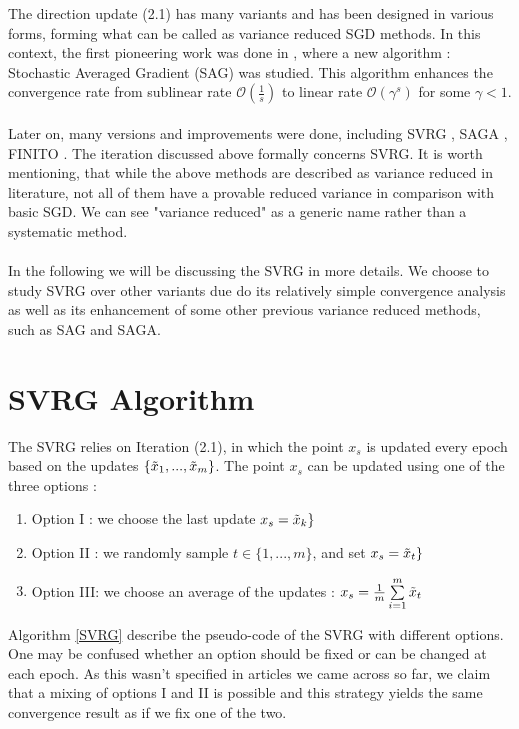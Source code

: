 \documentclass[12pt]{report}
\begin{document}
The direction update (2.1) has many variants and has been designed in various forms, forming what can be called as variance reduced SGD methods. In this context, the first pioneering work was done in \cite{schmidt2017minimizing}, where a new algorithm : Stochastic Averaged Gradient (SAG) was studied. This algorithm enhances the convergence rate from sublinear rate $\mathcal{O}(\frac{1}{s})$ to linear rate $\mathcal{O}(\gamma^s)$ for some $\gamma<1$. \\
\\Later on, many versions and improvements were done, including SVRG \cite{johnson2013accelerating}, SAGA \cite{defazio2014saga}, FINITO \cite{defazio2014finito}.
The iteration discussed above formally concerns SVRG.
It is worth mentioning, that while the above methods are described as variance reduced in literature, not all of them have a provable reduced variance in comparison with basic SGD. We can see "variance reduced" as a generic name rather than a systematic method. \\
\\In the following we will be discussing the SVRG in more details. We choose to study SVRG over other variants due do its relatively simple convergence analysis as well as its enhancement of some other previous variance reduced methods, such as SAG and SAGA.


\section{SVRG Algorithm}
The SVRG relies on Iteration (2.1), in which the point $x_s$ is updated every epoch based on the updates $\{\Tilde{x}_1,...,\Tilde{x}_m\}$. The point $x_s$ can be updated using one of the three options : 
\begin{enumerate}
    \item Option I : we choose the last update $x_s=\Tilde{x}_k\}$
    \item Option II : we randomly sample $t\in\{1,...,m\}$, and set $x_s=\Tilde{x}_t\}$
    \item Option III: we choose an average of the updates : $x_s=\frac{1}{m}\sum\limits_{i=1}^m \Tilde{x}_t$ 
\end{enumerate}
Algorithm \ref{SVRG} describe the pseudo-code of the SVRG with different options. One may be confused whether an option should be fixed or can be changed at each epoch. As this wasn't specified in articles we came across so far, we claim that a mixing of options I and II is possible and this strategy yields the same convergence result as if we fix one of the two. 
\end{document}
